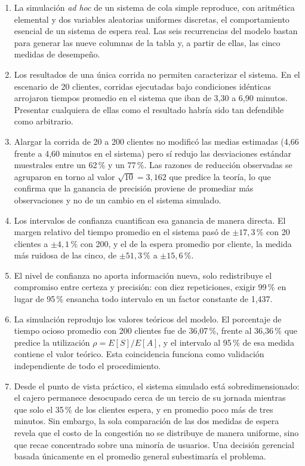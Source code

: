 \documentclass[11pt,letterpaper]{article}
\begin{document}
\begin{enumerate}[itemsep=4pt]
    \item La simulación \emph{ad hoc} de un sistema de cola simple reproduce, con aritmética elemental y dos variables aleatorias uniformes discretas, el comportamiento esencial de un sistema de espera real. Las seis recurrencias del modelo bastan para generar las nueve columnas de la tabla y, a partir de ellas, las cinco medidas de desempeño.

    \item Los resultados de una única corrida no permiten caracterizar el sistema. En el escenario de 20 clientes, corridas ejecutadas bajo condiciones idénticas arrojaron tiempos promedio en el sistema que iban de 3,30 a 6,90 minutos. Presentar cualquiera de ellas como \guillemotleft el resultado\guillemotright{} habría sido tan defendible como arbitrario.

    \item Alargar la corrida de 20 a 200 clientes no modificó las medias estimadas (4,66 frente a 4,60 minutos en el sistema) pero sí redujo las desviaciones estándar muestrales entre un 62\,\% y un 77\,\%. Las razones de reducción observadas se agruparon en torno al valor $\sqrt{10} = 3{,}162$ que predice la teoría, lo que confirma que la ganancia de precisión proviene de promediar más observaciones y no de un cambio en el sistema simulado.

    \item Los intervalos de confianza cuantifican esa ganancia de manera directa. El margen relativo del tiempo promedio en el sistema pasó de $\pm 17{,}3\,\%$ con 20 clientes a $\pm 4{,}1\,\%$ con 200, y el de la espera promedio por cliente, la medida más ruidosa de las cinco, de $\pm 51{,}3\,\%$ a $\pm 15{,}6\,\%$.

    \item El nivel de confianza no aporta información nueva, solo redistribuye el compromiso entre certeza y precisión: con diez repeticiones, exigir 99\,\% en lugar de 95\,\% ensancha todo intervalo en un factor constante de 1,437.

    \item La simulación reprodujo los valores teóricos del modelo. El porcentaje de tiempo ocioso promedio con 200 clientes fue de 36,07\,\%, frente al 36,36\,\% que predice la utilización $\rho = E[S]/E[A]$, y el intervalo al 95\,\% de esa medida contiene el valor teórico. Esta coincidencia funciona como validación independiente de todo el procedimiento.

    \item Desde el punto de vista práctico, el sistema simulado está sobredimensionado: el cajero permanece desocupado cerca de un tercio de su jornada mientras que solo el 35\,\% de los clientes espera, y en promedio poco más de tres minutos. Sin embargo, la sola comparación de las dos medidas de espera revela que el costo de la congestión no se distribuye de manera uniforme, sino que recae concentrado sobre una minoría de usuarios. Una decisión gerencial basada únicamente en el promedio general subestimaría el problema.
\end{enumerate}
\end{document}
